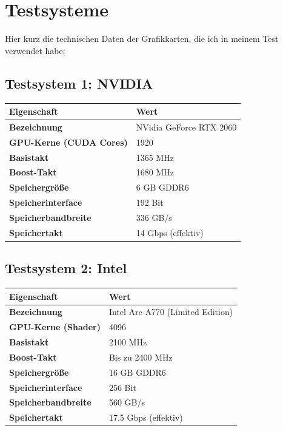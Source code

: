 \documentclass[12pt]{article}
\begin{document}
	\section*{Testsysteme}
	Hier kurz die technischen Daten der Grafikkarten, die ich in meinem Test verwendet habe:
	
	\subsection*{Testsystem 1: NVIDIA}
	\begin{tabular}{@{}ll@{}}
		\toprule
		\textbf{Eigenschaft}             & \textbf{Wert}                      \\ \midrule
		\textbf{Bezeichnung}			& NVidia GeForce RTX 2060			\\
		\textbf{GPU-Kerne (CUDA Cores)} & 1920                               \\
		\textbf{Basistakt}              & 1365 MHz                           \\
		\textbf{Boost-Takt}             & 1680 MHz                           \\
		\textbf{Speichergröße}          & 6 GB GDDR6                         \\
		\textbf{Speicherinterface}      & 192 Bit                            \\
		\textbf{Speicherbandbreite}     & 336 GB/s                           \\
		\textbf{Speichertakt}           & 14 Gbps (effektiv)                 \\
		\bottomrule
	\end{tabular}
	
	\subsection*{Testsystem 2: Intel}
	\begin{tabular}{@{}ll@{}}
		\toprule
		\textbf{Eigenschaft}             & \textbf{Wert}                         \\ \midrule
		\textbf{Bezeichnung}		     & Intel Arc A770 (Limited Edition)		\\
		\textbf{GPU-Kerne (Shader)}      & 4096                                   \\
		\textbf{Basistakt}               & 2100 MHz                              \\
		\textbf{Boost-Takt}              & Bis zu 2400 MHz                       \\
		\textbf{Speichergröße}           & 16 GB GDDR6                           \\
		\textbf{Speicherinterface}       & 256 Bit                               \\
		\textbf{Speicherbandbreite}      & 560 GB/s                              \\
		\textbf{Speichertakt}            & 17.5 Gbps (effektiv)                  \\
		\bottomrule
	\end{tabular}
	
\end{document}
